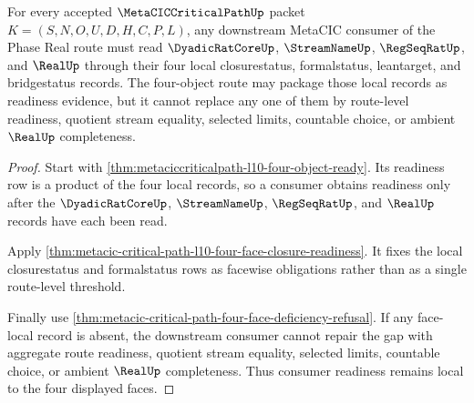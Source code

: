 \begin{theorem}
\label{thm:metacic-critical-path-l10-consumer-readiness-locality}
For every accepted $\MetaCICCriticalPathUp$ packet $K=(S,N,O,U,D,H,C,P,L)$, any downstream MetaCIC consumer of the Phase Real route must read $\DyadicRatCoreUp$, $\StreamNameUp$, $\RegSeqRatUp$, and $\RealUp$ through their four local closurestatus, formalstatus, leantarget, and bridgestatus records. The four-object route may package those local records as readiness evidence, but it cannot replace any one of them by route-level readiness, quotient stream equality, selected limits, countable choice, or ambient $\RealUp$ completeness.
\end{theorem}
\begin{proof}
Start with \autoref{thm:metaciccriticalpath-l10-four-object-ready}. Its readiness row is a product of the four local records, so a consumer obtains readiness only after the $\DyadicRatCoreUp$, $\StreamNameUp$, $\RegSeqRatUp$, and $\RealUp$ records have each been read.

Apply \autoref{thm:metacic-critical-path-l10-four-face-closure-readiness}. It fixes the local closurestatus and formalstatus rows as facewise obligations rather than as a single route-level threshold.

Finally use \autoref{thm:metacic-critical-path-four-face-deficiency-refusal}. If any face-local record is absent, the downstream consumer cannot repair the gap with aggregate route readiness, quotient stream equality, selected limits, countable choice, or ambient $\RealUp$ completeness. Thus consumer readiness remains local to the four displayed faces.
\end{proof}

